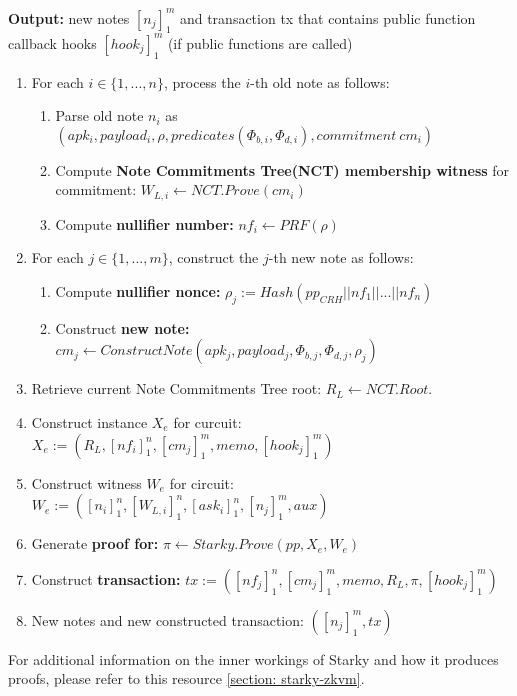 \textbf{Output:} new notes $[n_j]_1^m$ and transaction tx that contains public function callback hooks $[hook_j]_1^m$ (if public functions are called)

\begin{enumerate}
    \item For each $i \in \{1, ..., n\}$, process the $i$-th old note as follows:
        \begin{enumerate}
            \item Parse old note $n_i$ as $(apk_i, payload_i, \rho, predicates(\Phi_{b,i}, \Phi_{d,i}), commitment \ cm_i)$
            \item Compute \textbf{Note Commitments Tree(NCT) membership witness} for commitment: $W_{L,i} \leftarrow NCT.Prove(cm_i)$
            \item Compute \textbf{nullifier number:} $nf_i \leftarrow PRF(\rho)$
        \end{enumerate}
    \item For each $j \in \{1, ..., m\}$, construct the $j$-th new note as follows:
        \begin{enumerate}
            \item Compute \textbf{nullifier nonce:} $\rho_j := Hash(pp_{CRH} || nf_1 || ... || nf_n)$
            \item Construct \textbf{new note:} $cm_j \leftarrow ConstructNote(apk_j, payload_j, \Phi_{b,j}, \Phi_{d,j}, \rho_j)$
        \end{enumerate}
    \item Retrieve current Note Commitments Tree root: $R_L \leftarrow NCT.Root$.
    \item Construct instance $X_e$ for curcuit: $X_e := (R_L, [nf_i]_1^n, [cm_j]_1^m, memo, [hook_j]_1^m)$
    \item Construct witness $W_e$ for circuit: $W_e := ([n_i]_1^n, [W_{L,i}]_1^n, [ask_i]_1^n, [n_j]_1^m, aux)$
    \item Generate \textbf{proof for:} $\pi \leftarrow Starky.Prove(pp, X_e, W_e)$
    \item Construct \textbf{transaction:} $tx := ([nf_j]_1^n, [cm_j]_1^m, memo, R_L, \pi, [hook_j]_1^m)$
    \item New notes and new constructed transaction: $([n_j]_1^m, tx)$
\end{enumerate}
\normalcolor{}

For additional information on the inner workings of Starky and how it produces proofs, please refer to this resource \ref{section: starky-zkvm}.
